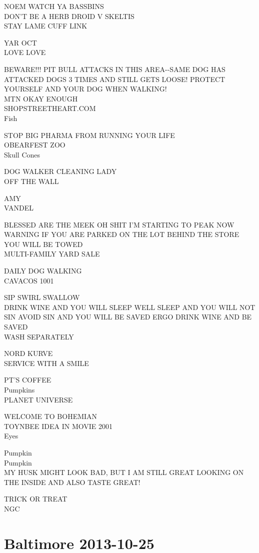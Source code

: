 \documentclass[10pt,letterpaper]{article}
\begin{document}
NOEM WATCH YA BASSBINS\\
DON'T BE A HERB DROID V SKELTIS\\
STAY LAME CUFF LINK

YAR OCT\\
LOVE LOVE

BEWARE!!! PIT BULL ATTACKS IN THIS AREA{-}{-}SAME DOG HAS ATTACKED DOGS 3 TIMES AND STILL GETS LOOSE! PROTECT YOURSELF AND YOUR DOG WHEN WALKING!\\
MTN OKAY ENOUGH\\
SHOPSTREETHEART.COM\\
Fish

STOP BIG PHARMA FROM RUNNING YOUR LIFE\\
OBEARFEST ZOO\\
Skull Cones

DOG WALKER CLEANING LADY\\
OFF THE WALL

AMY\\
VANDEL

BLESSED ARE THE MEEK OH SHIT I'M STARTING TO PEAK NOW\\
WARNING IF YOU ARE PARKED ON THE LOT BEHIND THE STORE YOU WILL BE TOWED\\
MULTI{-}FAMILY YARD SALE

DAILY DOG WALKING\\
CAVACOS 1001

SIP SWIRL SWALLOW\\
DRINK WINE AND YOU WILL SLEEP WELL SLEEP AND YOU WILL NOT SIN AVOID SIN AND YOU WILL BE SAVED ERGO DRINK WINE AND BE SAVED\\
WASH SEPARATELY

NORD KURVE\\
SERVICE WITH A SMILE

PT'S COFFEE\\
Pumpkins\\
PLANET UNIVERSE

WELCOME TO BOHEMIAN\\
TOYNBEE IDEA IN MOVIE 2001\\
Eyes

Pumpkin\\
Pumpkin\\
MY HUSK MIGHT LOOK BAD, BUT I AM STILL GREAT LOOKING ON THE INSIDE AND ALSO TASTE GREAT!

TRICK OR TREAT\\
NGC
\

\section*{Baltimore 2013-10-25}
\end{document}
